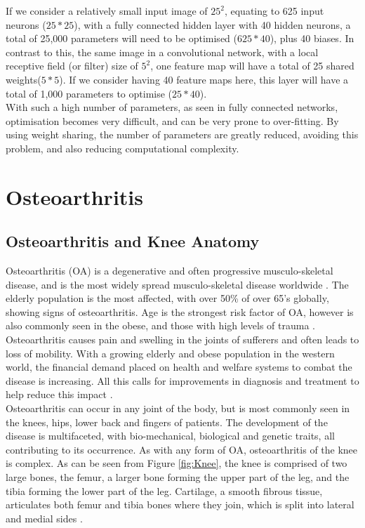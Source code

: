 \documentclass[11pt,a4paper]{memoir}
\numberwithin{figure}{section}
\numberwithin{table}{section}
\numberwithin{equation}{section}
\begin{document}
If we consider a relatively small input image of $25^2$, equating to 625 input neurons ($25*25$), with a fully connected hidden layer with 40 hidden neurons, a total of 25,000 parameters will need to be optimised ($625 * 40$), plus 40 biases. In contrast to this, the same image in a convolutional network, with a local receptive field (or filter) size of $5^2$, one feature map will have a total of 25 shared weights($5 *5$). If we consider having 40 feature maps here, this layer will have a total of 1,000  parameters to optimise ($25 * 40$). \\

With such a high number of parameters, as seen in fully connected networks, optimisation becomes very difficult, and can be very prone to over-fitting. By using weight sharing, the number of parameters are greatly reduced, avoiding this problem, and also reducing computational complexity.\\

\clearpage

\chapter{Osteoarthritis}
\section{Osteoarthritis and Knee Anatomy}
Osteoarthritis (OA) is a degenerative and often progressive musculo-skeletal disease, and is the most widely spread musculo-skeletal disease worldwide \cite{Lawrence2008}. The elderly population is the most affected, with over 50\% of over 65's globally, showing signs of osteoarthritis. Age is the strongest risk factor of OA, however is also commonly seen in the obese, and those with high levels of trauma \cite{Glyn-Jones2015}. \\

Osteoarthritis causes pain and swelling in the joints of sufferers and often leads to loss of mobility. With a growing elderly and obese population in the western world, the financial demand placed on health and welfare systems to combat the disease is increasing. All this calls for improvements in diagnosis and treatment to help reduce this impact \cite{Zhang2010EpidemiologyOsteoarthritis.}.  \\

Osteoarthritis can occur in any joint of the body, but is most commonly seen in the knees, hips, lower back and fingers of patients. The development of the disease is multifaceted, with bio-mechanical, biological and genetic traits, all contributing to its occurrence. As with any form of OA, osteoarthritis of the knee is complex. As can be seen from Figure \ref{fig:Knee}, the knee is comprised of two large bones, the femur, a larger bone forming the upper part of the leg, and the tibia forming the lower part of the leg. Cartilage, a smooth fibrous tissue,  articulates both femur and tibia bones where they join, which is split into lateral and medial sides \cite{Majumdar2010AdvancesOsteoarthritis}.  \\
\end{document}

